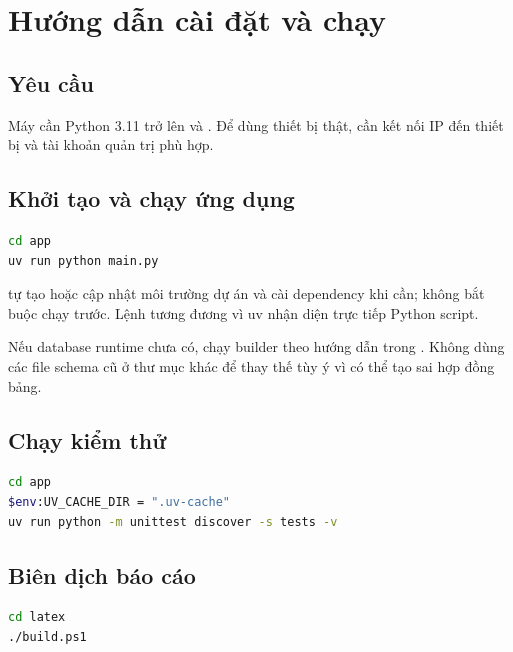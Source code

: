 \chapter{Hướng dẫn cài đặt và chạy}
\label{app:install}

\section{Yêu cầu}

Máy cần Python 3.11 trở lên và . Để dùng thiết bị thật, cần kết nối IP đến thiết bị và tài khoản quản trị phù hợp.

\section{Khởi tạo và chạy ứng dụng}

\begin{lstlisting}[language=bash,caption={Chạy NetworkTools từ repository}]
cd app
uv run python main.py
\end{lstlisting}

 tự tạo hoặc cập nhật môi trường dự án và cài dependency khi cần; không bắt buộc chạy  trước. Lệnh  tương đương vì uv nhận diện trực tiếp Python script.

Nếu database runtime chưa có, chạy builder theo hướng dẫn trong . Không dùng các file schema cũ ở thư mục khác để thay thế tùy ý vì có thể tạo sai hợp đồng bảng.

\section{Chạy kiểm thử}

\begin{lstlisting}[language=bash,caption={Chạy toàn bộ test với cache trong workspace}]
cd app
$env:UV_CACHE_DIR = ".uv-cache"
uv run python -m unittest discover -s tests -v
\end{lstlisting}

\section{Biên dịch báo cáo}

\begin{lstlisting}[language=bash,caption={Biên dịch bằng XeLaTeX/latexmk}]
cd latex
./build.ps1
\end{lstlisting}
